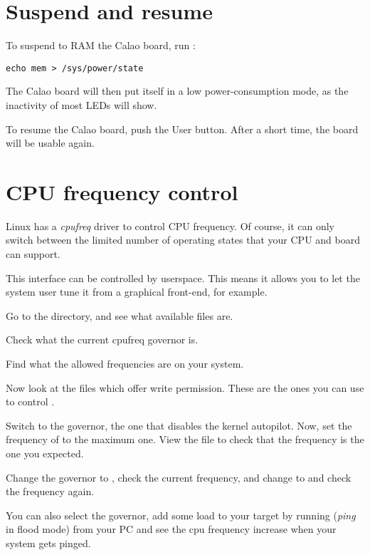 \section{Suspend and resume}

To suspend to RAM the Calao board, run :

\begin{verbatim}
echo mem > /sys/power/state
\end{verbatim}

The Calao board will then put itself in a low power-consumption mode,
as the inactivity of most LEDs will show.

To resume the Calao board, push the User button. After a short time,
the board will be usable again.

\section{CPU frequency control}

Linux has a {\em cpufreq} driver to control CPU frequency. Of course, it can
only switch between the limited number of operating states that your
CPU and board can support.

This interface can be controlled by userspace. This means it allows
you to let the system user tune it from a graphical front-end, for
example.

Go to the  directory, and
see what available files are.

Check what the current cpufreq governor is.

Find what the allowed frequencies are on your system.

Now look at the files which offer write permission. These are the ones
you can use to control .

Switch to the  governor, the one that disables the
kernel autopilot.  Now, set the frequency of  to the maximum
one. View the  file to check that the
frequency is the one you expected.

Change the governor to , check the current frequency,
and change to  and check the frequency again.

You can also select the  governor, add some load to your
target by running  ({\em ping} in flood mode) from
your PC and see the cpu frequency increase when your system gets
pinged.

